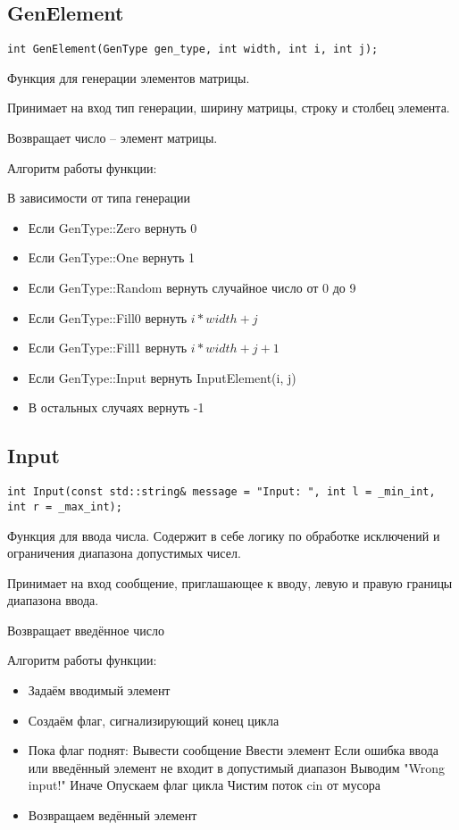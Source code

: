 \subsection*{GenElement}

\begin{lstlisting}[label={lst:GenElement}]
	int GenElement(GenType gen_type, int width, int i, int j);
\end{lstlisting}

Функция для генерации элементов матрицы.

Принимает на вход тип генерации, ширину матрицы,
строку и столбец элемента.

Возвращает число -- элемент матрицы.

Алгоритм работы функции:

В зависимости от типа генерации
\begin{itemize}
	\item Если GenType::Zero вернуть 0
	\item Если GenType::One вернуть 1
	\item Если GenType::Random вернуть случайное число от 0 до 9
	\item Если GenType::Fill0 вернуть $ i*width+j $
	\item Если GenType::Fill1 вернуть $ i*width+j+1 $
	\item Если GenType::Input вернуть InputElement(i, j)
	\item В остальных случаях вернуть -1
\end{itemize}

\subsection*{Input}

\begin{lstlisting}[label={lst:Input}]
	int Input(const std::string& message = "Input: ", int l = _min_int, int r = _max_int);
\end{lstlisting}

Функция для ввода числа.
Содержит в себе логику по обработке исключений и
ограничения диапазона допустимых чисел.

Принимает на вход сообщение, приглашающее к вводу,
левую и правую границы диапазона ввода.

Возвращает введённое число

Алгоритм работы функции:

\begin{itemize}
	\item Задаём вводимый элемент
	\item Создаём флаг, сигнализирующий конец цикла
	\item Пока флаг поднят:
	\subitem Вывести сообщение
	\subitem Ввести элемент
	\subitem Если ошибка ввода или введённый элемент не входит в допустимый диапазон
	\subsubitem Выводим "Wrong input!"
	\subitem Иначе
	\subsubitem Опускаем флаг цикла
	\subitem Чистим поток cin от мусора
	\item Возвращаем ведённый элемент
\end{itemize}

